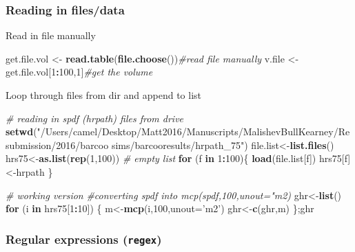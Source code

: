 \documentclass[10,portrait]{article}
\newenvironment{Shaded}{\begin{snugshade}}{\end{snugshade}}
\newcommand{\KeywordTok}[1]{\textcolor[rgb]{0.13,0.29,0.53}{\textbf{#1}}}
\newcommand{\DataTypeTok}[1]{\textcolor[rgb]{0.13,0.29,0.53}{#1}}
\newcommand{\DecValTok}[1]{\textcolor[rgb]{0.00,0.00,0.81}{#1}}
\newcommand{\StringTok}[1]{\textcolor[rgb]{0.31,0.60,0.02}{#1}}
\newcommand{\CommentTok}[1]{\textcolor[rgb]{0.56,0.35,0.01}{\textit{#1}}}
\newcommand{\ControlFlowTok}[1]{\textcolor[rgb]{0.13,0.29,0.53}{\textbf{#1}}}
\newcommand{\OperatorTok}[1]{\textcolor[rgb]{0.81,0.36,0.00}{\textbf{#1}}}
\newcommand{\NormalTok}[1]{#1}
\begin{document}
\subsubsection{Reading in files/data}\label{reading-in-filesdata}

Read in file manually

\begin{Shaded}
\begin{Highlighting}[]
\NormalTok{get.file.vol <-}\StringTok{ }\KeywordTok{read.table}\NormalTok{(}\KeywordTok{file.choose}\NormalTok{())}\CommentTok{#read file manually}
\NormalTok{v.file <-}\StringTok{ }\NormalTok{get.file.vol[}\DecValTok{1}\OperatorTok{:}\DecValTok{100}\NormalTok{,}\DecValTok{1}\NormalTok{]}\CommentTok{#get the volume}
\end{Highlighting}
\end{Shaded}

Loop through files from dir and append to list

\begin{Shaded}
\begin{Highlighting}[]
\CommentTok{# reading in spdf (hrpath) files from drive}
\KeywordTok{setwd}\NormalTok{(}\StringTok{"/Users/camel/Desktop/Matt2016/Manuscripts/MalishevBullKearney/Resubmission/2016/barcoo sims/barcooresults/hrpath_75"}\NormalTok{)}
\NormalTok{file.list<-}\KeywordTok{list.files}\NormalTok{()}
\NormalTok{hrs75<-}\KeywordTok{as.list}\NormalTok{(}\KeywordTok{rep}\NormalTok{(}\DecValTok{1}\NormalTok{,}\DecValTok{100}\NormalTok{)) }\CommentTok{# empty list}
\ControlFlowTok{for}\NormalTok{ (f }\ControlFlowTok{in} \DecValTok{1}\OperatorTok{:}\DecValTok{100}\NormalTok{)\{}
  \KeywordTok{load}\NormalTok{(file.list[f])}
\NormalTok{  hrs75[f]<-hrpath}
\NormalTok{\}}

\CommentTok{# working version}
\CommentTok{#converting spdf into mcp(spdf,100,unout="m2)}
\NormalTok{ghr<-}\KeywordTok{list}\NormalTok{()}
\ControlFlowTok{for}\NormalTok{ (i }\ControlFlowTok{in}\NormalTok{ hrs75[}\DecValTok{1}\OperatorTok{:}\DecValTok{10}\NormalTok{]) \{}
\NormalTok{  m<-}\KeywordTok{mcp}\NormalTok{(i,}\DecValTok{100}\NormalTok{,}\DataTypeTok{unout=}\StringTok{'m2'}\NormalTok{)}
\NormalTok{  ghr<-}\KeywordTok{c}\NormalTok{(ghr,m)}
\NormalTok{\};ghr}
\end{Highlighting}
\end{Shaded}

\subsubsection{\texorpdfstring{Regular expressions
(\texttt{regex})}{Regular expressions (regex)}}\label{regular-expressions-regex}
\end{document}
